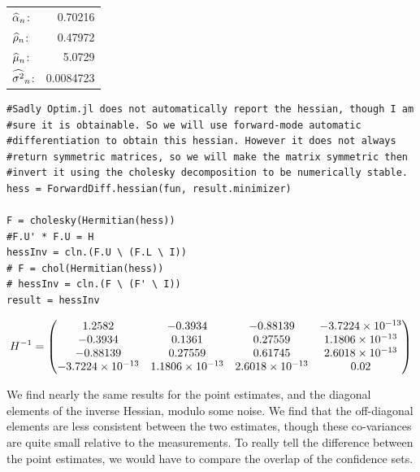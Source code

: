 \documentclass[12pt, letterpaper]{paper}
\begin{document}
\begin{center}
\begin{tabular}{lr}
\(\widehat{ \alpha }_{n}\): & 0.70216\\
\(\widehat{ \rho }_{n}\): & 0.47972\\
\(\widehat{ \mu }_{n}\): & 5.0729\\
\(\widehat{ \sigma^{2} }_{n}\): & 0.0084723\\
\end{tabular}
\end{center}

\begin{verbatim}
#Sadly Optim.jl does not automatically report the hessian, though I am
#sure it is obtainable. So we will use forward-mode automatic
#differentiation to obtain this hessian. However it does not always
#return symmetric matrices, so we will make the matrix symmetric then
#invert it using the cholesky decomposition to be numerically stable.
hess = ForwardDiff.hessian(fun, result.minimizer)

F = cholesky(Hermitian(hess))
#F.U' * F.U = H
hessInv = cln.(F.U \ (F.L \ I))
# F = chol(Hermitian(hess))
# hessInv = cln.(F \ (F' \ I))
result = hessInv
\end{verbatim}


\begin{equation*}
  {H}^{-1} =
  \begin{pmatrix}
    1.2582 & -0.3934 & -0.88139 & -3.7224 \times 10^{-13}\\
-0.3934 & 0.1361 & 0.27559 & 1.1806 \times 10^{-13}\\
-0.88139 & 0.27559 & 0.61745 & 2.6018 \times 10^{-13}\\
-3.7224 \times 10^{-13} & 1.1806 \times 10^{-13} & 2.6018 \times 10^{-13} & 0.02
  \end{pmatrix}
\end{equation*}


We find nearly the same results for the point estimates, and the
diagonal elements of the inverse Hessian, modulo some noise. We find
that the off-diagonal elements are less consistent between the two
estimates, though these co-variances are quite small relative to the
measurements. To really tell the difference between the point
estimates, we would have to compare the overlap of the confidence
sets. 
\end{document}
